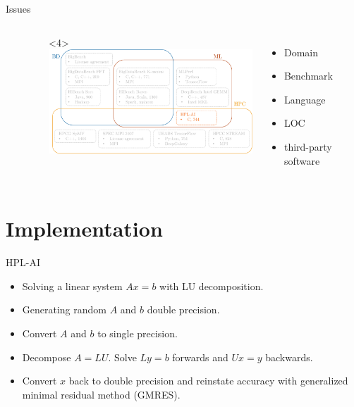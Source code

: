 \documentclass[aspectratio=169]{beamer}
\begin{document}
\begin{frame}[c]{Issues}
\begin{figure}
\begin{columns}[onlytextwidth]
\begin{onlyenv}
            \end{onlyenv}    
            \begin{onlyenv}<4>%
            \includegraphics[width=1\textwidth]{images/Benchmarks_SEL.png}%
            \end{onlyenv}              
            \begin{itemize}
                \item Domain
                \item Benchmark
                \item Language
                \item LOC
                \item third-party software
            \end{itemize}
        \end{columns}        
    \end{figure}          
\end{frame}


\section{Implementation}

\begin{frame}[c]{HPL-AI}
\begin{itemize}
    \item Solving a linear system $Ax=b$ with LU decomposition.
    \item Generating random $A$ and $b$ double precision.
    \item Convert $A$ and $b$ to single precision.
    \item Decompose $A=LU$. Solve $Ly=b$ forwards and $Ux=y$ backwards.
    \item Convert $x$ back to double precision and reinstate accuracy with generalized minimal residual method (GMRES).
\end{itemize}   
\end{frame}
\end{document}
